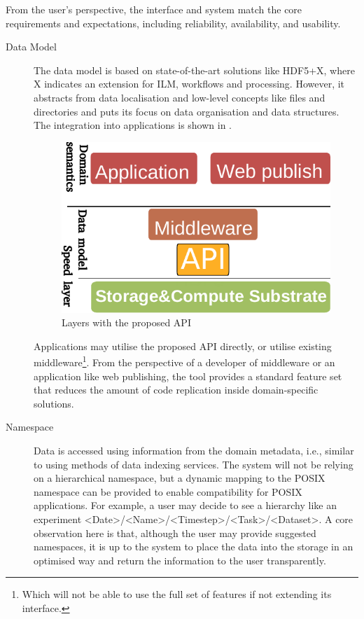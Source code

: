 \documentclass[a4paper]{article}
\begin{document}
{{\newcommand{\bnf}[1]{\textless #1\textgreater}

From the user's perspective, the interface and system match the core requirements and expectations, including reliability, availability, and usability.

\begin{description}

\item[Data Model]

The data model is based on state-of-the-art solutions like HDF5+X, where X indicates an extension for ILM, workflows and processing.
However, it abstracts from data localisation and low-level concepts like files and directories and puts its focus on data organisation and data structures.
The integration into applications is shown in .

\begin{figure}[H]
  \centering
  \includegraphics[width=0.5\columnwidth]{layers-api}
  \caption{Layers with the proposed API}
  \label{fig:apilayers}
\end{figure}

Applications may utilise the proposed API directly, or utilise existing middleware\footnote{Which will not be able to use the full set of features if not extending its interface.}.
From the perspective of a developer of middleware or an application like web publishing, the tool provides a standard feature set that reduces the amount of code replication inside domain-specific solutions.

\item[Namespace]

Data is accessed using information from the domain metadata, i.e., similar to using methods of data indexing services.
The system will not be relying on a hierarchical namespace, but a dynamic mapping to the POSIX namespace can be provided to enable compatibility for POSIX applications.
For example, a user may decide to see a hierarchy like an experiment \bnf{Date}/\bnf{Name}/\bnf{Timestep}/\bnf{Task}/\bnf{Dataset}.
A core observation here is that, although the user may provide suggested namespaces, it is up to the system to place the data into the storage in an optimised way and return the information to the user transparently.


\end{description}}}
\end{document}
